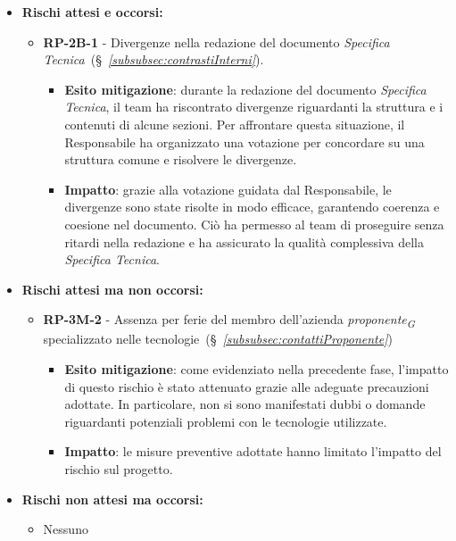 \begin{itemize}
    \item \textbf{Rischi attesi e occorsi:}
        \begin{itemize}
            \item \textbf{RP-2B-1} - Divergenze nella redazione del documento \textit{Specifica Tecnica}~(\S~\textit{\ref{subsubsec:contrastiInterni}}).
            \begin{itemize}
                \item \textbf{Esito mitigazione}: durante la redazione del documento \textit{Specifica Tecnica}, il team ha riscontrato divergenze riguardanti la struttura e i contenuti di alcune sezioni. Per affrontare questa situazione, il Responsabile ha organizzato una votazione per concordare su una struttura comune e risolvere le divergenze.
                \item \textbf{Impatto}: grazie alla votazione guidata dal Responsabile, le divergenze sono state risolte in modo efficace, garantendo coerenza e coesione nel documento. Ciò ha permesso al team di proseguire senza ritardi nella redazione e ha assicurato la qualità complessiva della \textit{Specifica Tecnica}.
            \end{itemize}
            
        \end{itemize}
    \item \textbf{Rischi attesi ma non occorsi:}
        \begin{itemize}
            \item \textbf{RP-3M-2} - Assenza per ferie del membro dell'azienda \textit{proponente}\textsubscript{\textit{G}} specializzato nelle tecnologie~(\S~\textit{\ref{subsubsec:contattiProponente}})
                \begin{itemize}
                    \item \textbf{Esito mitigazione}: come evidenziato nella precedente fase, l'impatto di questo rischio è stato attenuato grazie alle adeguate precauzioni adottate. In particolare, non si sono manifestati dubbi o domande riguardanti potenziali problemi con le tecnologie utilizzate.
                    \item \textbf{Impatto}: 
                    le misure preventive adottate hanno limitato l'impatto del rischio sul progetto.
                \end{itemize}
        \end{itemize}
    \item \textbf{Rischi non attesi ma occorsi:}
        \begin{itemize}
            \item Nessuno
        \end{itemize}
\end{itemize}


